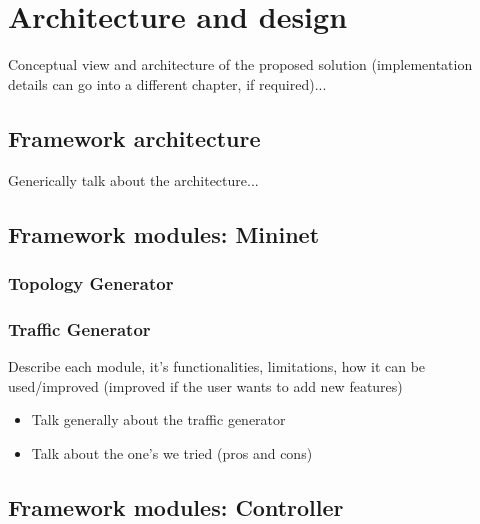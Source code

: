 \documentclass[12pt,english]{book}
\begin{document}


\chapter{Architecture and design \label{cha:arqdes} }

Conceptual view and architecture of the proposed solution (implementation details can go into a different chapter, if required)...

\section{Framework architecture}

Generically talk about the architecture...


\section{Framework modules: Mininet}

\subsection{Topology Generator}

\subsection{Traffic Generator}

Describe each module, it's functionalities, limitations, how it can be used/improved (improved if the user wants to add new features)

\begin{itemize}
	\item Talk generally about the traffic generator
	\item Talk about the one's we tried (pros and cons)
\end{itemize}

\newpage


\section{Framework modules: Controller}
\end{document}
